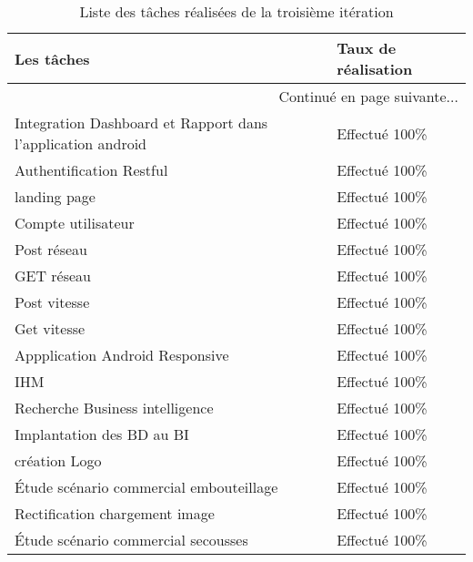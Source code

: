 \begin{center}
    \begin{longtable}{| l | l |}
        \caption{Liste des tâches réalisées de la troisième itération}
        \label{tab:sprint3-estimation} \\

        \hline
        \textbf{Les tâches} & \textbf{Taux de réalisation} \\ \hline
        \endhead

        \hline \multicolumn{2}{|r|}{{Continué en page suivante$\dotsc$}} \\ \hline
        \endfoot

        \hline \hline
        \endlastfoot

        \hline
Integration Dashboard et Rapport dans l'application android & Effectué 100\% \\ \hline
Authentification Restful&  Effectué 100\% \\ \hline
landing page& Effectué 100\% \\ \hline
Compte utilisateur& Effectué 100\% \\ \hline
Post réseau& Effectué 100\% \\ \hline
GET réseau&  Effectué 100\% \\ \hline
Post vitesse&  Effectué 100\% \\ \hline
Get vitesse& Effectué 100\% \\ \hline
Appplication Android Responsive & Effectué 100\% \\ \hline
IHM & Effectué 100\% \\ \hline
Recherche Business intelligence& Effectué 100\% \\ \hline
Implantation des BD au BI & Effectué 100\% \\ \hline
création Logo&  Effectué 100\% \\ \hline
Étude scénario commercial embouteillage& Effectué 100\% \\ \hline
Rectification chargement image & Effectué 100\% \\ \hline
Étude scénario commercial secousses &  Effectué 100\% \\ \hline
\end{longtable}
\end{center}
